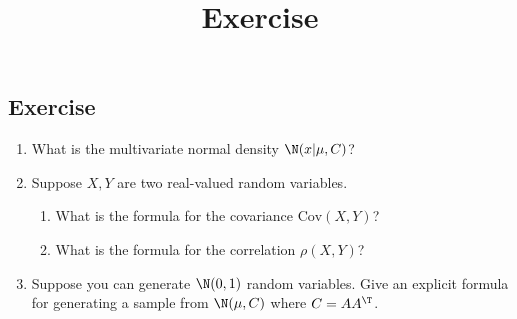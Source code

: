 \documentclass[12pt]{article}
\title{Exercise}
\author{}
\date{}
\begin{document}
\maketitle


\subsection*{Exercise}
\begin{enumerate}
    \item What is the multivariate normal density $\N(x|\mu,C)$?
    \item Suppose $X,Y$ are two real-valued random variables.
    \begin{enumerate}
        \item What is the formula for the covariance $\mathrm{Cov}(X,Y)$?
        \item What is the formula for the correlation $\rho(X,Y)$?
    \end{enumerate}
    \item Suppose you can generate $\N(0,1)$ random variables. Give an explicit formula for generating a sample from $\N(\mu,C)$ where $C=A A^\T$.
\end{enumerate}
\end{document}
